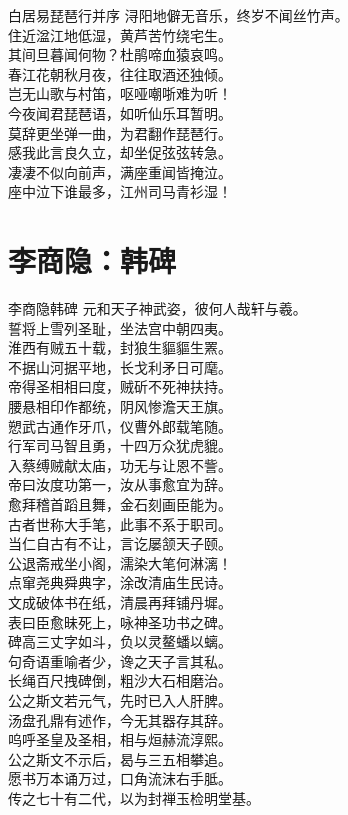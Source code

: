 \documentclass[12pt,oneside,a5paper]{book}
\begin{document}
\begin{poemzh}{白居易}{琵琶行并序}
浔阳地僻无音乐，终岁不闻丝竹声。\\
住近湓江地低湿，黄芦苦竹绕宅生。\\
其间旦暮闻何物？杜鹃啼血猿哀鸣。\\
春江花朝秋月夜，往往取酒还独倾。\\
岂无山歌与村笛，呕哑嘲哳难为听！\\
今夜闻君琵琶语，如听仙乐耳暂明。\\
莫辞更坐弹一曲，为君翻作琵琶行。\\
感我此言良久立，却坐促弦弦转急。\\
凄凄不似向前声，满座重闻皆掩泣。\\
座中泣下谁最多，江州司马青衫湿！\\ 
\end{poemzh}

\chapter{李商隐：韩碑}
\begin{poemzh}{李商隐}{韩碑}
元和天子神武姿，彼何人哉轩与羲。\\
誓将上雪列圣耻，坐法宫中朝四夷。\\
淮西有贼五十载，封狼生貙貙生罴。\\
不据山河据平地，长戈利矛日可麾。\\
帝得圣相相曰度，贼斫不死神扶持。\\
腰悬相印作都统，阴风惨澹天王旗。\\
愬武古通作牙爪，仪曹外郎载笔随。\\
行军司马智且勇，十四万众犹虎貔。\\
入蔡缚贼献太庙，功无与让恩不訾。\\
帝曰汝度功第一，汝从事愈宜为辞。\\
愈拜稽首蹈且舞，金石刻画臣能为。\\
古者世称大手笔，此事不系于职司。\\
当仁自古有不让，言讫屡颔天子颐。\\
公退斋戒坐小阁，濡染大笔何淋漓！\\
点窜尧典舜典字，涂改清庙生民诗。\\
文成破体书在纸，清晨再拜铺丹墀。\\
表曰臣愈昧死上，咏神圣功书之碑。\\
碑高三丈字如斗，负以灵鳌蟠以螭。\\
句奇语重喻者少，谗之天子言其私。\\
长绳百尺拽碑倒，粗沙大石相磨治。\\
公之斯文若元气，先时已入人肝脾。\\
汤盘孔鼎有述作，今无其器存其辞。\\
呜呼圣皇及圣相，相与烜赫流淳熙。\\
公之斯文不示后，曷与三五相攀追。\\
愿书万本诵万过，口角流沫右手胝。\\
传之七十有二代，以为封禅玉检明堂基。\\ 
\end{poemzh}
\end{document}
